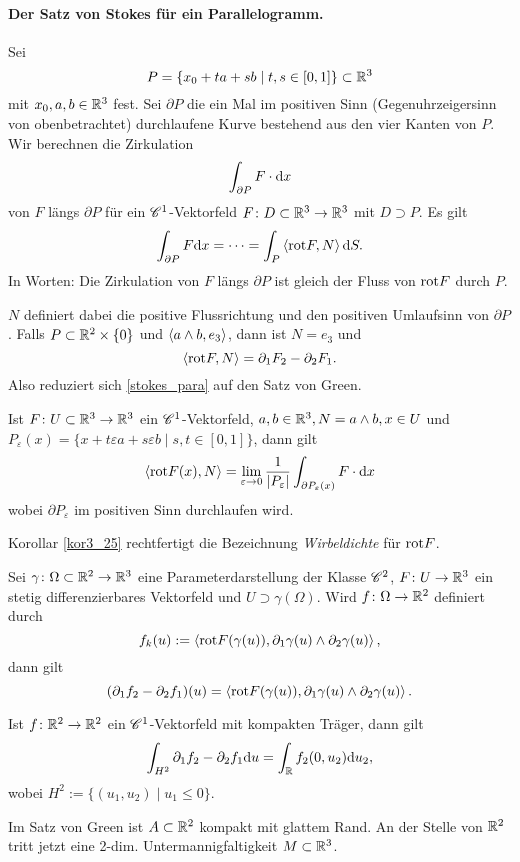 \paragraph{Der Satz von Stokes für ein Parallelogramm. } Sei
\[P = \{x_0 + ta + sb \mid t,s \in [0,1]\} \subset \mathbb{R}^3\]
mit $x_0, a,b \in \mathbb{R}^3$ fest. Sei $\partial P$ die ein Mal im positiven Sinn (Gegenuhrzeigersinn von \glqq{}oben\grqq betrachtet) durchlaufene Kurve bestehend aus den vier Kanten von $P$. Wir berechnen die Zirkulation
\[\int_{\partial P} F \cdot \mathrm{d} x\]
von $F$ längs $\partial P$ für  ein $\mathscr{C}^1$-Vektorfeld $F \colon D \subset \mathbb{R}^3 \to \mathbb{R}^3$ mit $D \supset P$. Es gilt
\begin{equation}
	\int_{\partial P} F \mathrm{d} x = \dots = \int_P \left\langle\mathrm{rot} F,N \right\rangle \mathrm{d} S\label{stokes_para}.
\end{equation}
In Worten: \glqq{}Die Zirkulation von $F$ längs $\partial P$ ist gleich der Fluss von $\mathrm{rot} F$ durch $P$.\grqq

$N$ definiert dabei die positive Flussrichtung und den positiven Umlaufsinn von $\partial P$. Falls $P \subset \mathbb{R}^2 \times \{0\}$ und $\left\langle a \wedge b,e_3 \right\rangle$, dann ist $N = e_3$ und
\[\left\langle\mathrm{rot} F,N \right\rangle = \partial_1 F_2 - \partial_2 F_1.\]
Also reduziert sich \eqref{stokes_para} auf den Satz von Green.
\begin{kor}\label{kor3_25}
	Ist $F \colon U \subset \mathbb{R}^3 \to \mathbb{R}^3$ ein $\mathscr{C}^1$-Vektorfeld, $a,b \in \mathbb{R}^3, N = a\wedge b, x \in U$ und $P_\varepsilon(x) = \{x + t \varepsilon a + s \varepsilon b\mid s,t \in [0,1]\}$, dann gilt
	\[\left\langle\mathrm{rot} F(x),N \right\rangle = \lim_{\varepsilon \to 0} \frac{1}{|P_\varepsilon|} \int_{\partial P_\varepsilon(x)} F \cdot \mathrm{d} x\]
	wobei $\partial P_\varepsilon$ im positiven Sinn durchlaufen wird.
\end{kor}
Korollar \ref{kor3_25} rechtfertigt die Bezeichnung \textit{Wirbeldichte} für $\mathrm{rot} F$.
\begin{lem}\label{lem3_26}
	Sei $\gamma \colon \Omega \subset \mathbb{R}^2 \to \mathbb{R}^3$ eine Parameterdarstellung der Klasse $\mathscr{C}^2$, $F \colon U \to \mathbb{R}^3$ ein stetig differenzierbares Vektorfeld und $U \supset \gamma(\Omega)$. Wird $f \colon \Omega \to \mathbb{R}^2$ definiert durch
	\[f_k(u) := \left\langle\mathrm{rot} F(\gamma(u)),\partial_1 \gamma(u) \wedge \partial_2 \gamma(u) \right\rangle,\]
	dann gilt
	\[(\partial_1 f_2 - \partial_2 f_1)(u) = \left\langle\mathrm{rot} F(\gamma(u)),\partial_1 \gamma(u) \wedge \partial_2 \gamma(u) \right\rangle.\]
\end{lem}
\begin{lem}\label{lem3_27}
	Ist $f \colon \mathbb{R}^2 \to \mathbb{R}^2$ ein $\mathscr{C}^1$-Vektorfeld mit kompakten Träger, dann gilt
	\[\int_{H^2} \partial_1 f_2 - \partial_2 f_1 \mathrm{d} u = \int_{\mathbb{R}} f_2 (0,u_2) \mathrm{d} u_2,\]
	wobei $H^2 := \{(u_1, u_2) \mid u_1 \leq 0\}$.
\end{lem}
Im Satz von Green ist $A \subset \mathbb{R}^2$ kompakt mit glattem Rand. An der Stelle von $\mathbb{R}^2$ tritt jetzt eine 2-dim. Untermannigfaltigkeit $M \subset \mathbb{R}^3$.

